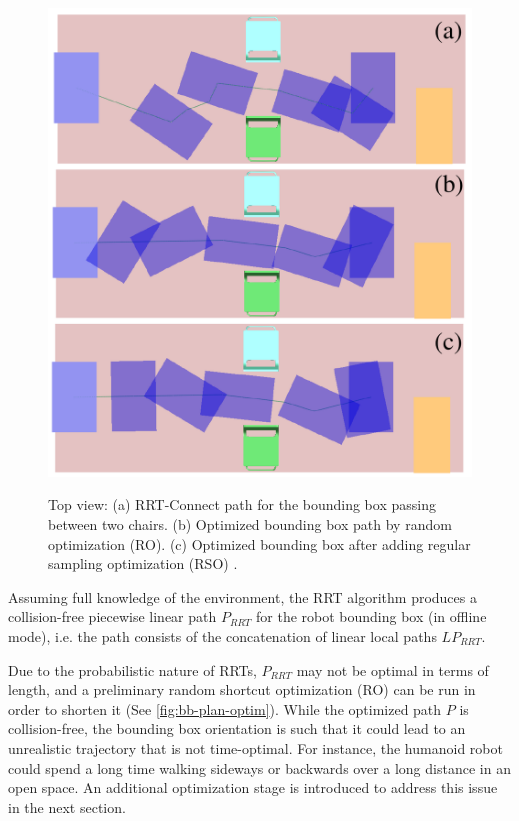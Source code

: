 \begin{figure}
  \centering
      {\includegraphics[width = \linewidth]{src/chap1-path-optimization/bb-plan-optim.pdf}}
      \caption{Top view: (a) RRT-Connect path for the bounding box
        passing between two chairs. (b) Optimized bounding box path by
        random optimization (RO). (c) Optimized bounding box after
        adding regular sampling optimization (RSO) .}
      \label{fig:bb-plan-optim}
\end{figure}

\noindent Assuming full knowledge of the environment, the RRT
algorithm produces a collision-free piecewise linear path $P_{RRT}$
for the robot bounding box (in offline mode), i.e. the path consists
of the concatenation of linear local paths $LP_{RRT}$.

Due to the probabilistic nature of RRTs, $P_{RRT}$ may not be optimal
in terms of length, and a preliminary random shortcut optimization
(RO) can be run in order to shorten it (See
\autoref{fig:bb-plan-optim}). While the optimized path $P$ is
collision-free, the bounding box orientation is such that it could
lead to an unrealistic trajectory that is not time-optimal. For
instance, the humanoid robot could spend a long time walking sideways
or backwards over a long distance in an open space. An additional
optimization stage is introduced to address this issue in the next
section.

